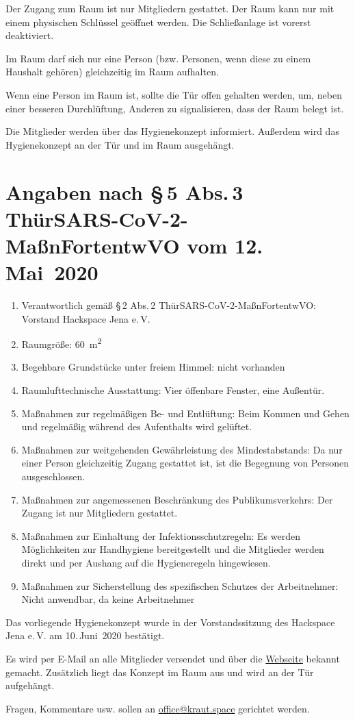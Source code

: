 \documentclass[a4paper,12pt,parskip=half]{scrartcl}
\begin{document}
Der Zugang zum Raum ist nur Mitgliedern gestattet. Der Raum kann nur mit einem
physischen Schlüssel geöffnet werden. Die Schließanlage ist vorerst deaktiviert.

Im Raum darf sich nur eine Person (bzw. Personen, wenn diese zu einem Haushalt gehören) gleichzeitig im Raum aufhalten.

Wenn eine Person im Raum ist, sollte die Tür offen gehalten werden, um, neben einer besseren Durchlüftung, Anderen zu signalisieren, dass der Raum belegt ist. 

Die Mitglieder werden über das Hygienekonzept informiert. Außerdem wird das Hygienekonzept an der Tür und im Raum ausgehängt.

\section*{Angaben nach §\,5 Abs.\,3 ThürSARS-CoV-2-MaßnFortentwVO vom
  12.\,Mai~2020}

\begin{enumerate}
 \item Verantwortlich gemäß §\,2 Abs.\,2 ThürSARS-CoV-2-MaßnFortentwVO: Vorstand Hackspace Jena e.\,V.
 \item Raumgröße: \SI{60}{\square\metre}
 \item Begehbare Grundstücke unter freiem Himmel: nicht vorhanden
 \item Raumlufttechnische Ausstattung: Vier öffenbare Fenster, eine Außentür.
 \item Maßnahmen zur regelmäßigen Be- und Entlüftung: Beim Kommen und Gehen und regelmäßig während des Aufenthalts wird gelüftet.
 \item Maßnahmen zur weitgehenden Gewährleistung des Mindestabstands: Da nur einer Person gleichzeitig Zugang gestattet ist, ist die Begegnung von Personen ausgeschlossen.
 \item Maßnahmen zur angemessenen Beschränkung des Publikumsverkehrs: Der Zugang ist nur Mitgliedern gestattet.
 \item Maßnahmen zur Einhaltung der Infektionsschutzregeln: Es werden Möglichkeiten zur Handhygiene bereitgestellt und die Mitglieder werden direkt und per Aushang auf die Hygieneregeln hingewiesen.
 \item Maßnahmen zur Sicherstellung des spezifischen Schutzes der Arbeitnehmer: Nicht anwendbar, da keine Arbeitnehmer
\end{enumerate}

Das vorliegende Hygienekonzept wurde in der Vorstandssitzung des Hackspace Jena e.\,V. am 10.\,Juni~2020 bestätigt.

Es wird per E-Mail an alle Mitglieder versendet und über die
\href{https://kraut.space}{Webseite} bekannt gemacht. Zusätzlich liegt das Konzept im Raum aus und wird an der Tür aufgehängt.

Fragen, Kommentare usw. sollen an
\href{mailto:office@kraut.space}{office@kraut.space} gerichtet werden.

\begin{versionhistory}
\end{versionhistory}
\end{document}
